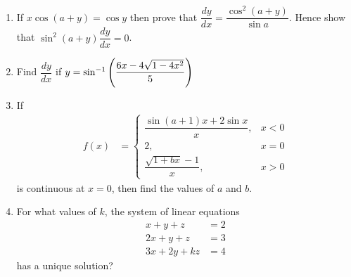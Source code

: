 \begin{enumerate}
\item If $x\cos(a+y) = \cos{y}$ then prove that $\dfrac{dy}{dx} = \dfrac{\cos^2(a+y)}{\sin{a}}$. Hence show that $\sin^2(a+y)\dfrac{dy}{dx} = 0$.

\item Find $\dfrac{dy}{dx}$ if $y = \sin^{-1}\left(\dfrac{6x - 4\sqrt{1-4x^2}}{5}\right)$

\item If \begin{align*}
		f(x) &= \begin{cases}\dfrac{\sin(a+1)x + 2\sin x}{x}, &x<0\\ 2, &x=0 \\ \dfrac{\sqrt{1+bx}-1}{x}, &x>0 \end{cases}\end{align*} is continuous at $x=0$, then find the values of $a$ and $b$.

\item For what values of $k$, the system of linear equations
\begin{align*}
x+y+z &= 2\\
2x+y+z &= 3\\
3x+2y+kz &= 4
\end{align*}
has a unique solution?

\end{enumerate}
